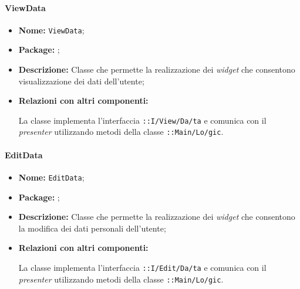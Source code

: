 \paragraph{ViewData}
\begin{flushleft}
\begin{itemize}
\item \textbf{Nome:} \texttt{ViewData};
\item \textbf{Package:} \texttt{\viewUser{}};
\item \textbf{Descrizione:} Classe che permette la realizzazione dei \textit{widget} che consentono visualizzazione dei dati dell'utente;
\item \textbf{Relazioni con altri componenti:}
\begin{sloppypar}
La classe implementa l'interfaccia \texttt{\iViewUser{}::I\fshyp{}View\fshyp{}Da\fshyp{}ta} e comunica con il \textit{presenter} utilizzando metodi della classe \texttt{\logicUser{}::Main\fshyp{}Lo\fshyp{}gic}.
\end{sloppypar}
\end{itemize}
\end{flushleft}

\paragraph{EditData}
\begin{flushleft}
\begin{itemize}
\item \textbf{Nome:} \texttt{EditData};
\item \textbf{Package:} \texttt{\viewUser{}};
\item \textbf{Descrizione:} Classe che permette la realizzazione dei \textit{widget} che consentono la modifica dei dati personali dell'utente;
\item \textbf{Relazioni con altri componenti:}
\begin{sloppypar}
La classe implementa l'interfaccia \texttt{\iViewUser{}::I\fshyp{}Edit\fshyp{}Da\fshyp{}ta} e comunica con il \textit{presenter} utilizzando metodi della classe \texttt{\logicUser{}::Main\fshyp{}Lo\fshyp{}gic}.
\end{sloppypar}
\end{itemize}
\end{flushleft}

